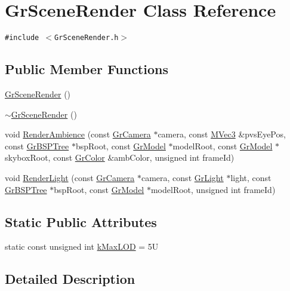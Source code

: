 \hypertarget{class_gr_scene_render}{
\section{GrSceneRender Class Reference}
\label{class_gr_scene_render}
}
{\tt \#include $<$GrSceneRender.h$>$}

\subsection*{Public Member Functions}
\begin{CompactItemize}
\item 
\hyperlink{class_gr_scene_render_092d37ccce05bcf350aa89099376cd1a}{GrSceneRender} ()
\item 
\hyperlink{class_gr_scene_render_2fa5b2608cd04ca49156de2446fc3e17}{$\sim$GrSceneRender} ()
\item 
void \hyperlink{class_gr_scene_render_70bf228594a41d830084e5619dbec778}{RenderAmbience} (const \hyperlink{class_gr_camera}{GrCamera} $\ast$camera, const \hyperlink{class_m_vec3}{MVec3} \&pvsEyePos, const \hyperlink{class_gr_b_s_p_tree}{GrBSPTree} $\ast$bspRoot, const \hyperlink{class_gr_model}{GrModel} $\ast$modelRoot, const \hyperlink{class_gr_model}{GrModel} $\ast$skyboxRoot, const \hyperlink{class_gr_color}{GrColor} \&ambColor, unsigned int frameId)
\item 
void \hyperlink{class_gr_scene_render_a476db0635147928ad7d0806303d60a3}{RenderLight} (const \hyperlink{class_gr_camera}{GrCamera} $\ast$camera, const \hyperlink{class_gr_light}{GrLight} $\ast$light, const \hyperlink{class_gr_b_s_p_tree}{GrBSPTree} $\ast$bspRoot, const \hyperlink{class_gr_model}{GrModel} $\ast$modelRoot, unsigned int frameId)
\end{CompactItemize}
\subsection*{Static Public Attributes}
\begin{CompactItemize}
\item 
static const unsigned int \hyperlink{class_gr_scene_render_af3f39ad08e5db676b53f3025999caf3}{kMaxLOD} = 5U
\end{CompactItemize}


\subsection{Detailed Description}


